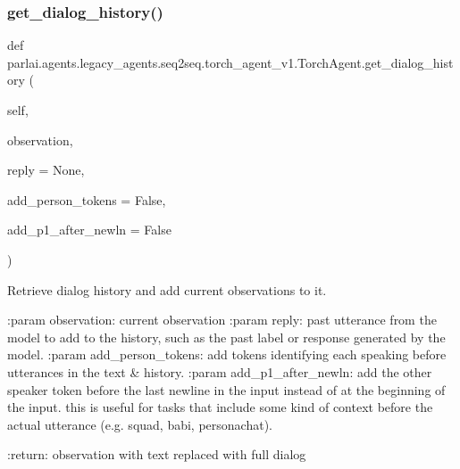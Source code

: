 \subsubsection{\texorpdfstring{get\+\_\+dialog\+\_\+history()}{get\_dialog\_history()}}
{\footnotesize\ttfamily def parlai.\+agents.\+legacy\+\_\+agents.\+seq2seq.\+torch\+\_\+agent\+\_\+v1.\+Torch\+Agent.\+get\+\_\+dialog\+\_\+history (\begin{DoxyParamCaption}\item[{}]{self,  }\item[{}]{observation,  }\item[{}]{reply = {\ttfamily None},  }\item[{}]{add\+\_\+person\+\_\+tokens = {\ttfamily False},  }\item[{}]{add\+\_\+p1\+\_\+after\+\_\+newln = {\ttfamily False} }\end{DoxyParamCaption})}

\begin{DoxyVerb}Retrieve dialog history and add current observations to it.

:param observation:        current observation
:param reply:              past utterance from the model to add to the
                   history, such as the past label or response
                   generated by the model.
:param add_person_tokens:  add tokens identifying each speaking before
                   utterances in the text & history.
:param add_p1_after_newln: add the other speaker token before the last
                   newline in the input instead of at the
                   beginning of the input. this is useful for
                   tasks that include some kind of context
                   before the actual utterance (e.g. squad,
                   babi, personachat).

:return: observation with text replaced with full dialog
\end{DoxyVerb}
 \mbox{\label{classparlai_1_1agents_1_1legacy__agents_1_1seq2seq_1_1torch__agent__v1_1_1TorchAgent_a1727b17db185dcc7237d893018c7b76c}} 
